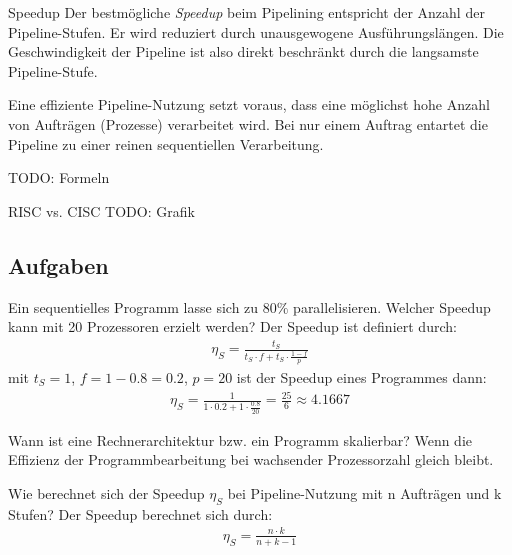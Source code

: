 \begin{defi}[Pipelining]{Speedup}
    Der bestmögliche \emph{Speedup} beim Pipelining entspricht der Anzahl der Pipeline-Stufen.
    Er wird reduziert durch unausgewogene Ausführungslängen.
    Die Geschwindigkeit der Pipeline ist also direkt beschränkt durch die langsamste Pipeline-Stufe.
    
    Eine effiziente Pipeline-Nutzung setzt voraus, dass eine möglichst hohe Anzahl von Aufträgen (Prozesse) verarbeitet wird.
    Bei nur einem Auftrag entartet die Pipeline zu einer reinen sequentiellen Verarbeitung.
    
    TODO: Formeln
\end{defi}

\begin{example}[Pipelining]{RISC vs. CISC}
    TODO: Grafik
\end{example}

\subsection{Aufgaben}

{ 
    Ein sequentielles Programm lasse sich zu $80\%$ parallelisieren. 
    Welcher Speedup kann mit 20 Prozessoren erzielt werden?
}
{
    Der Speedup ist definiert durch: 
    \begin{align*}
        \eta_S = \frac{t_S}{t_S \cdot f + t_S \cdot \frac{1-f}{p}}
    \end{align*}
    mit $t_S=1$, $f=1-0.8=0.2$, $p=20$ ist der Speedup eines Programmes dann:
    \begin{align*}
        \eta_S = \frac{1}{1 \cdot 0.2 + 1 \cdot \frac{0.8}{20}} = \frac{25}{6} \approx 4.1667
    \end{align*}
}

{
    Wann ist eine Rechnerarchitektur bzw. ein Programm skalierbar?
}
{
    Wenn die Effizienz der Programmbearbeitung bei wachsender Prozessorzahl gleich bleibt.
}

{
    Wie berechnet sich der Speedup $\eta_S$ bei Pipeline-Nutzung mit n Aufträgen und k Stufen?
}
{
    Der Speedup berechnet sich durch: 
    \begin{align*}
        \eta_S = \frac{n\cdot k}{n+k-1}
    \end{align*}
}
